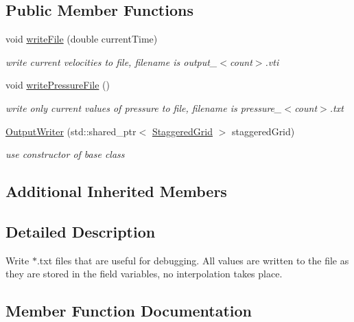 \subsection*{Public Member Functions}
\begin{DoxyCompactItemize}
\item 
void \mbox{\hyperlink{classOutputWriterText_a25a12ea2524fc34e9acb19ef1f4c7431}{write\+File}} (double current\+Time)
\begin{DoxyCompactList}\small\item\em write current velocities to file, filename is output\+\_\+$<$count$>$.\+vti \end{DoxyCompactList}\item 
void \mbox{\hyperlink{classOutputWriterText_a3480b58a23fd158f16d0ef9c1b67cbfd}{write\+Pressure\+File}} ()
\begin{DoxyCompactList}\small\item\em write only current values of pressure to file, filename is pressure\+\_\+$<$count$>$.\+txt \end{DoxyCompactList}\item 
\mbox{\hyperlink{classOutputWriterText_ab4b0b2f2bfe8157c8436b20e9d860fe8}{Output\+Writer}} (std\+::shared\+\_\+ptr$<$ \mbox{\hyperlink{classStaggeredGrid}{Staggered\+Grid}} $>$ staggered\+Grid)
\begin{DoxyCompactList}\small\item\em use constructor of base class \end{DoxyCompactList}\end{DoxyCompactItemize}
\subsection*{Additional Inherited Members}


\subsection{Detailed Description}
Write $\ast$.txt files that are useful for debugging. All values are written to the file as they are stored in the field variables, no interpolation takes place. 

\subsection{Member Function Documentation}
\mbox{\label{classOutputWriterText_ab4b0b2f2bfe8157c8436b20e9d860fe8}} 
